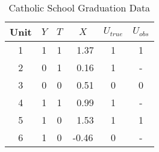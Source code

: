 \documentclass{article}
\begin{document}
\begin{table}[!h]
		\caption{Catholic School Graduation Data}
	\begin{center}
		\begin{tabular}{cccc|cc}
                  Unit & $Y$ & $T$ & $X$ & $U_{true}$ & $U_{obs}$\\ \hline  
                  1    & 1     & 1   &\ 1.37   & 1   & 1  \\ 
                  2    & 0     & 1   &\ 0.16   & 1    & -\\ 
                  3    & 0    &  0    &\ 0.51   & 0   & 0\\ 
                  4    & 1    &  1    &\ 0.99   & 1  & - \\ 
                  5   &  1    &  0    &\ 1.53   & 1   & 1\\ 
                  6  &  1     &  0     &-0.46   & 0  & -\\ 

		\end{tabular}
		\label{}
	\end{center}
\end{table}
\end{document}
